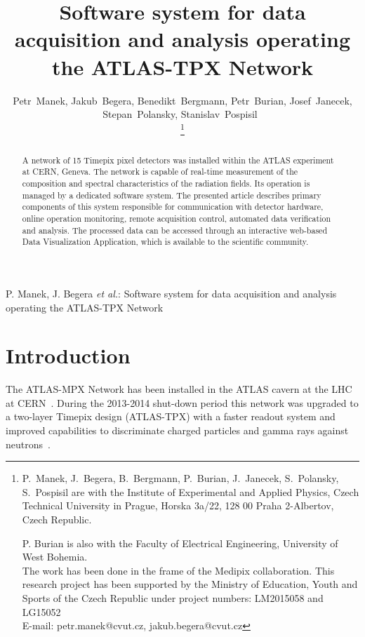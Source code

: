 \documentclass[journal]{IEEEtran}
\begin{document}
\title{Software system for data acquisition and analysis operating the ATLAS-TPX Network}

\author{Petr~Manek, Jakub~Begera, Benedikt~Bergmann, Petr~Burian, Josef~Janecek, Stepan~Polansky, Stanislav~Pospisil~

\thanks{P.~Manek, J.~Begera, B.~Bergmann, P.~Burian, J.~Janecek, S.~Polansky, S.~Pospisil are with the Institute of Experimental and Applied Physics, Czech Technical University in Prague, Horska 3a/22, 128 00 Praha 2-Albertov, Czech Republic.

P. Burian is also with the Faculty of Electrical Engineering, University of West Bohemia.\protect\\
The work has been done in the frame of the Medipix collaboration. This research project has been supported by the Ministry of Education, Youth and Sports of the Czech Republic under project numbers: LM2015058 and LG15052\protect\\
E-mail: petr.manek@cvut.cz, jakub.begera@cvut.cz}
}

\markboth{}%
{P. Manek, J. Begera \MakeLowercase{\textit{et al.}}: Software system for data acquisition and analysis operating the ATLAS-TPX Network}


\maketitle


\begin{abstract}
A network of 15 Timepix pixel detectors was installed within the ATLAS experiment at CERN, Geneva. The network is capable of real-time measurement of the composition and spectral characteristics of the radiation fields. Its operation is managed by a dedicated software system. The presented article describes primary components of this system responsible for communication with detector hardware, online operation monitoring, remote acquisition control, automated data verification and analysis. The processed data can be accessed through an interactive web-based Data Visualization Application, which is available to the scientific community.
\end{abstract}

\section{\label{sec:introduction}Introduction}
The ATLAS-MPX Network has been installed in the ATLAS cavern at the LHC at CERN~\cite{CampbellATLAS}. During the 2013-2014 shut-down period this network was upgraded to a two-layer Timepix design (ATLAS-TPX) with a faster readout system and improved capabilities to discriminate charged particles and gamma rays against neutrons~\cite{Proposal_Claude}.
\end{document}
